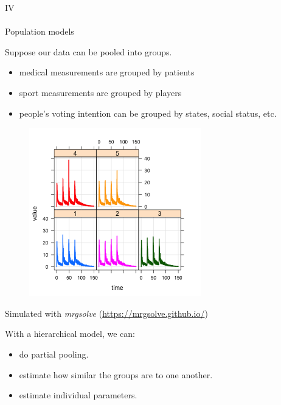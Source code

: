 \documentclass[xcolor=table]{beamer}
\begin{document}
 

\begin{frame}
  \begin{center}
    {\Large IV} \\ \ \\ Population models
  \end{center}
\end{frame}

\begin{frame}
  
  Suppose our data can be pooled into groups.
  \begin{itemize}
    \item medical measurements are grouped by patients
    \item sport measurements are grouped by players
     \item people's voting intention can be grouped by states, social status, etc.
  \end{itemize}

\end{frame}


\begin{frame}
  
  \begin{figure}
    \includegraphics[width = 7.5cm]{../figures/Dosing_regimes.png}
  \end{figure}

  Simulated with \textit{mrgsolve} (\url{https://mrgsolve.github.io/})

\end{frame}

\begin{frame}

  With a hierarchical model, we can:
  \begin{itemize}
    \item do partial pooling.
    \item estimate how similar the groups are to one another.
    \item estimate individual parameters.
  \end{itemize}

\end{frame}
\end{document}
